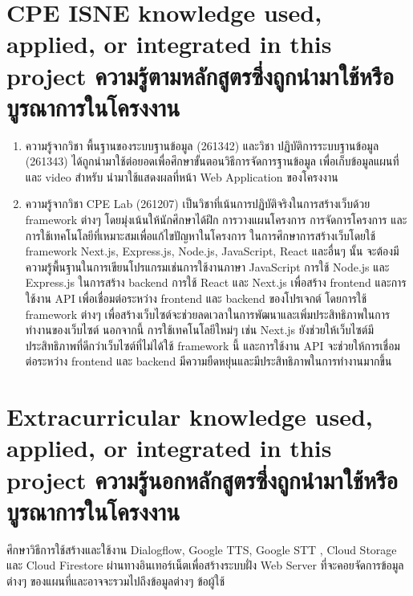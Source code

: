 \section{\ifenglish%
    \ifcpe CPE \else ISNE \fi knowledge used, applied, or integrated in this project
  \else%
    ความรู้ตามหลักสูตรซึ่งถูกนำมาใช้หรือบูรณาการในโครงงาน
  \fi
}
\begin{enumerate}
\item ความรู้จากวิชา พื้นฐานของระบบฐานข้อมูล (261342) และวิชา ปฏิบัติการระบบฐานข้อมูล
(261343) ได้ถูกนำมาใช้ต่อยอดเพื่อศึกษาขั้นตอนวิธีการจัดการฐานข้อมูล เพื่อเก็บข้อมูลแผนที่และ video สำหรับ
นำมาใช้แสดงผลที่หน้า Web Application ของโครงงาน
\item ความรู้จากวิชา CPE Lab (261207)  เป็นวิชาที่เน้นการปฏิบัติจริงในการสร้างเว็บด้วย framework ต่างๆ โดยมุ่งเน้นให้นักศึกษาได้ฝึก
การวางแผนโครงการ การจัดการโครงการ และการใช้เทคโนโลยีที่เหมาะสมเพื่อแก้ไขปัญหาในโครงการ
ในการศึกษาการสร้างเว็บโดยใช้ framework Next.js, Express.js, Node.js, JavaScript, React และอื่นๆ นั้น
จะต้องมีความรู้พื้นฐานในการเขียนโปรแกรมเช่นการใช้งานภาษา JavaScript การใช้ Node.js และ Express.js ในการสร้าง backend
การใช้ React และ Next.js เพื่อสร้าง frontend และการใช้งาน API เพื่อเชื่อมต่อระหว่าง frontend และ backend ของโปรเจกต์
โดยการใช้ framework ต่างๆ เพื่อสร้างเว็บไซต์จะช่วยลดเวลาในการพัฒนาและเพิ่มประสิทธิภาพในการทำงานของเว็บไซต์ นอกจากนี้
การใช้เทคโนโลยีใหม่ๆ เช่น Next.js ยังช่วยให้เว็บไซต์มีประสิทธิภาพที่ดีกว่าเว็บไซต์ที่ไม่ได้ใช้ framework นี้ และการใช้งาน API
จะช่วยให้การเชื่อมต่อระหว่าง frontend และ backend มีความยืดหยุ่นและมีประสิทธิภาพในการทำงานมากขึ้น
\end{enumerate}
\section{\ifenglish%
    Extracurricular knowledge used, applied, or integrated in this project
  \else%
    ความรู้นอกหลักสูตรซึ่งถูกนำมาใช้หรือบูรณาการในโครงงาน
  \fi
}

ศึกษาวิธีการใช้สร้างและใช้งาน Dialogflow, Google TTS, Google STT , Cloud Storage 
และ Cloud Firestore ผ่านทางอินเทอร์เน็ตเพื่อสร้างระบบฝั่ง Web Server ที่จะคอยจัดการข้อมูลต่างๆ
ของแผนที่และอาจจะรวมไปถึงข้อมูลต่างๆ ข้อผู้ใช้
